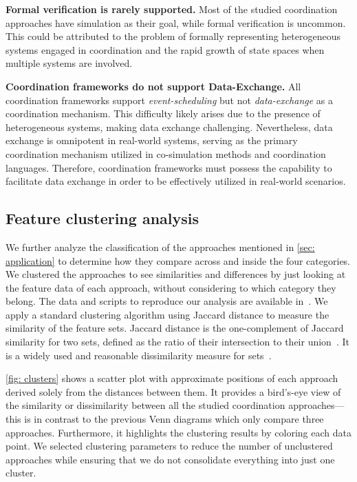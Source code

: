 \documentclass[runningheads]{llncs}
\begin{document}
\textbf{Formal verification is rarely supported.}
Most of the studied coordination approaches have simulation as their goal, while formal verification is uncommon.
This could be attributed to the problem of formally representing heterogeneous systems engaged in coordination and the rapid growth of state spaces when multiple systems are involved.

\textbf{Coordination frameworks do not support Data-Exchange.}
All coordination frameworks %
support \textit{event-scheduling} but not \textit{data-exchange} as a coordination mechanism.
This difficulty likely arises due to the presence of heterogeneous systems, making data exchange challenging.
Nevertheless, data exchange is omnipotent in real-world systems, serving as the primary coordination mechanism utilized in co-simulation methods and coordination languages.
Therefore, coordination frameworks must possess the capability to facilitate data exchange in order to be effectively utilized in real-world scenarios.

\subsection{Feature clustering analysis}

We further analyze the classification of the approaches mentioned in \autoref{sec: application} to determine how they compare across and inside the four categories.
We clustered the approaches to see similarities and differences by just looking at the feature data of each approach, without considering to which category they belong.
The data and scripts to reproduce our analysis are available in~\cite{timkrauterArtifactsCoordination2024}.
We apply a standard clustering algorithm using Jaccard distance to measure the similarity of the feature sets.
Jaccard distance is the one-complement of Jaccard similarity for two sets, defined as the ratio of their intersection to their union~\cite{levandowskyDistanceSets1971}.
It is a widely used and reasonable dissimilarity measure for sets~\cite{levandowskyDistanceSets1971}.

\autoref{fig: clusters} shows a scatter plot with approximate positions of each approach derived solely from the distances between them.
It provides a bird's-eye view of the similarity or dissimilarity between all the studied coordination approaches---this is in contrast to the previous Venn diagrams which only compare three approaches.
Furthermore, it highlights the clustering results by coloring each data point.
We selected clustering parameters to reduce the number of unclustered approaches while ensuring that we do not consolidate everything into just one cluster.
\end{document}
